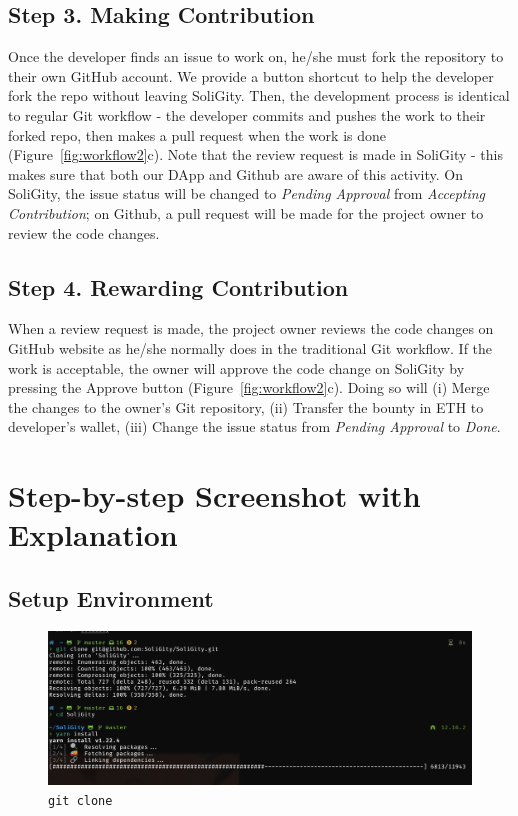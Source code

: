 \documentclass[12pt]{article}
\renewcommand{\_}{\kern-1.5pt\textunderscore\kern-1.5pt}
\begin{document}
\subsection*{Step 3. Making Contribution}

Once the developer finds an issue to work on, he/she must fork the repository to their own GitHub account. We provide a button shortcut to help the developer fork the repo without leaving SoliGity. Then, the development process is identical to regular Git workflow - the developer commits and pushes the work to their forked repo, then makes a pull request when the work is done (Figure~\ref{fig:workflow2}c). Note that the review request is made in SoliGity - this makes sure that both our DApp and Github are aware of this activity. On SoliGity, the issue status will be changed to \textit{Pending Approval} from \textit{Accepting Contribution}; on Github, a pull request will be made for the project owner to review the code changes.

\subsection*{Step 4. Rewarding Contribution}
When a review request is made, the project owner reviews the code changes on GitHub website as he/she normally does in the traditional Git workflow. If the work is acceptable, the owner will approve the code change on SoliGity by pressing the Approve button (Figure~\ref{fig:workflow2}c). Doing so will (i) Merge the changes to the owner’s Git repository,
(ii) Transfer the bounty in ETH to developer’s wallet,
(iii) Change the issue status from \textit{Pending Approval} to \textit{Done}.


\section{Step-by-step Screenshot with Explanation}


\subsection{Setup Environment}


\begin{figure}[H]
	\centering
	\includegraphics[width=13cm]{graphs/01. git_clone}
	\caption{\texttt{git clone}}
\end{figure}
\end{document}
